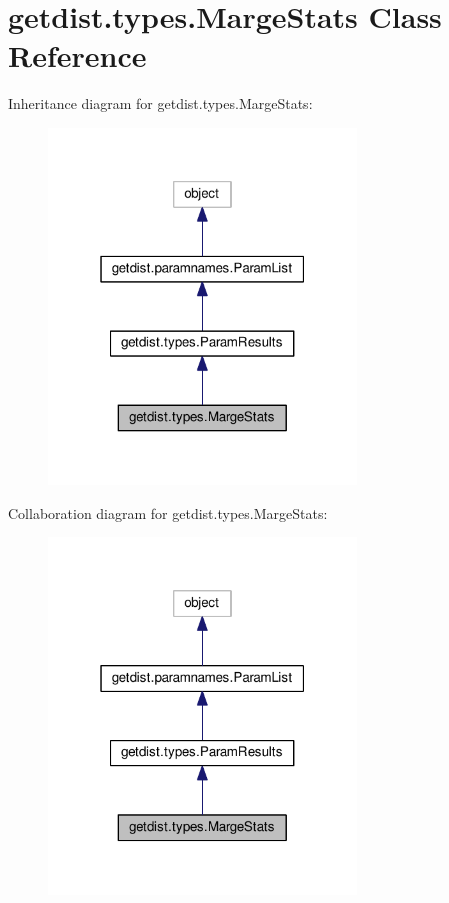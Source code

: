 \hypertarget{classgetdist_1_1types_1_1MargeStats}{}\section{getdist.\+types.\+Marge\+Stats Class Reference}
\label{classgetdist_1_1types_1_1MargeStats}


Inheritance diagram for getdist.\+types.\+Marge\+Stats\+:
\nopagebreak
\begin{figure}[H]
\begin{center}
\leavevmode
\includegraphics[width=232pt]{classgetdist_1_1types_1_1MargeStats__inherit__graph}
\end{center}
\end{figure}


Collaboration diagram for getdist.\+types.\+Marge\+Stats\+:
\nopagebreak
\begin{figure}[H]
\begin{center}
\leavevmode
\includegraphics[width=232pt]{classgetdist_1_1types_1_1MargeStats__coll__graph}
\end{center}
\end{figure}
